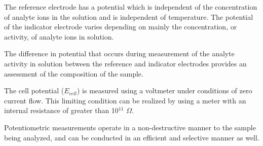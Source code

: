 \documentclass{article}
\begin{document}
The reference electrode has a potential which is
independent of the concentration of analyte ions in the solution and is
independent of temperature. The potential of the indicator electrode varies
depending on mainly the concentration, or activity, of analyte ions in solution.
\cite{tartu}

The difference in potential that occurs during measurement of the analyte
activity in solution between the reference and indicator electrodes provides an
assessment of the composition of the sample. \cite{lab_man}

The cell potential ($E_{cell}$) is measured using a voltmeter under
conditions of zero current flow. This limiting condition can be realized by
using a meter with an internal resistance of greater than 10$^{11}$ $\Omega$.
\cite{nmt}

Potentiometric measurements operate in a non-destructive manner to the sample being analyzed, and can be
conducted in an efficient and selective manner as well.
\end{document}
